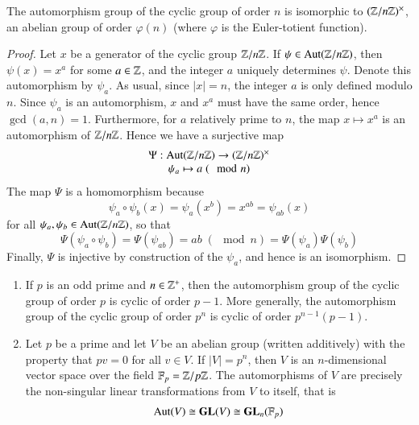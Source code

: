 \documentclass[12pt, a4paper, oneside, openright, titlepage]{book}
\begin{document}
\begin{prop}
    The automorphism group of the cyclic group of order $n$ is isomorphic to $(\mathbb Z/n\mathbb Z)^{\times}$, an abelian group of order $\varphi(n)$ (where $\varphi$ is the Euler-totient function).
\end{prop}
\begin{proof}
    Let $x$ be a generator of the cyclic group $\mathbb Z/n\mathbb Z$. If $\psi \in \operatorname{Aut}(\mathbb Z/n\mathbb Z)$, then $\psi(x) = x^a$ for some $a \in \mathbb Z$, and the integer $a$ uniquely determines $\psi$. Denote this automorphism by $\psi_a$. As usual, since $|x| = n$, the integer $a$ is only defined modulo $n$. Since $\psi_a$ is an automorphism, $x$ and $x^a$ must have the same order, hence $\gcd(a,n) = 1$. Furthermore, for $a$ relatively prime to $n$, the map $x\mapsto x^a$ is an automorphism of $\mathbb Z/n\mathbb Z$. Hence we have a surjective map \begin{equation*}
        \begin{array}{c} \Psi:\operatorname{Aut}(\mathbb Z/n\mathbb Z)\rightarrow (\mathbb Z/n\mathbb Z)^{\times} \\ \psi_a\mapsto a\; (\mod n) \end{array}
    \end{equation*}
    The map $\Psi$ is a homomorphism because \begin{equation*}
        \psi_a\circ\psi_b(x) = \psi_a(x^b) = x^{ab} = \psi_{ab}(x)
    \end{equation*}
    for all $\psi_a,\psi_b \in \operatorname{Aut}(\mathbb Z/n\mathbb Z)$, so that \begin{equation*}
        \Psi(\psi_a\circ\psi_b) = \Psi(\psi_{ab}) = ab\;(\mod n) = \Psi(\psi_a)\Psi(\psi_b)
    \end{equation*}
    Finally, $\Psi$ is injective by construction of the $\psi_a$, and hence is an isomorphism.
\end{proof}


\begin{eg}
    \leavevmode
    \begin{enumerate}
        \item If $p$ is an odd prime and $n \in \mathbb Z^+$, then the automorphism group of the cyclic group of order $p$ is cyclic of order $p-1$. More generally, the automorphism group of the cyclic group of order $p^n$ is cyclic of order $p^{n-1}(p-1)$.
        \item Let $p$ be a prime and let $V$ be an abelian group (written additively) with the property that $pv =0$ for all $v \in V$. If $|V| = p^n$, then $V$ is an $n$-dimensional vector space over the field $\mathbb F_p = \mathbb Z/p\mathbb Z$. The automorphisms of $V$ are precisely the non-singular linear transformations from $V$ to itself, that is \begin{equation*}
                \operatorname{Aut}(V) \cong \mathbf{GL}(V) \cong \mathbf{GL}_n(\mathbb F_p)
        \end{equation*}
    \end{enumerate}
\end{eg}
\end{document}
